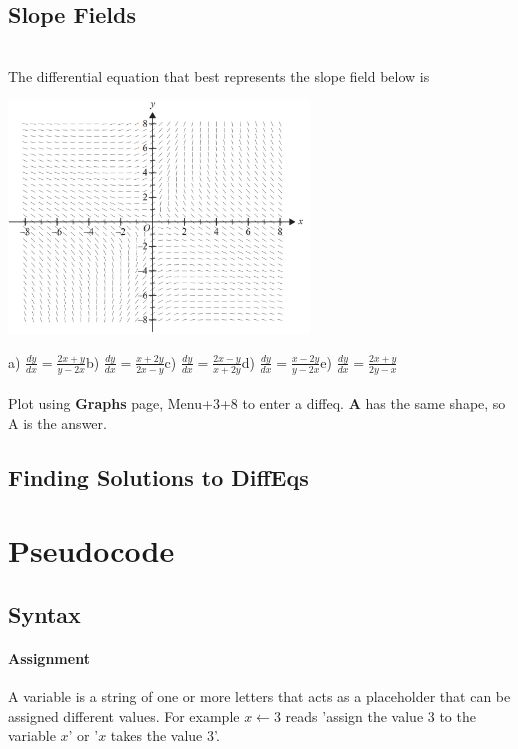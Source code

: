 \documentclass[a4paper,twoside,10pt]{article}
\newenvironment{examquestion}[1]{%
	\mbox{}\\\tcolorbox[beamer,breakable,%
	title=Exam-style Question: #1,standard jigsaw,opacityback=0, colframe=red!75!black, boxrule=2pt]}{\endtcolorbox\mbox{}\\}
\begin{document}
		\subsection{Slope Fields}
			\begin{examquestion}{2018 Exam 2 Question A10}
				The differential equation that best represents the slope field below is
				\begin{center}
					\includegraphics[width=8cm]{2018-2A10.png}\\
				\end{center}
				a) $\displaystyle \frac{dy}{dx}=\frac{2x+y}{y-2x}$\qquad b) $\displaystyle \frac{dy}{dx}=\frac{x+2y}{2x-y}$\qquad c) $\displaystyle \frac{dy}{dx}=\frac{2x-y}{x+2y}$\qquad d) $\displaystyle \frac{dy}{dx}=\frac{x-2y}{y-2x}$\qquad e) $\displaystyle \frac{dy}{dx}=\frac{2x+y}{2y-x}$\\\\
				Plot using \textbf{Graphs} page, Menu+3+8 to enter a diffeq. \textbf{A} has the same shape, so A is the answer.
			\end{examquestion}
		\subsection{Finding Solutions to DiffEqs}
			
	\section{Pseudocode}
		\subsection{Syntax}
			\paragraph{Assignment} A variable is a string of one or more letters that acts as a placeholder that can be assigned different values. For example $x\leftarrow3$ reads 'assign the value 3 to the variable $x$' or '$x$ takes the value 3'.
			
\end{document}

